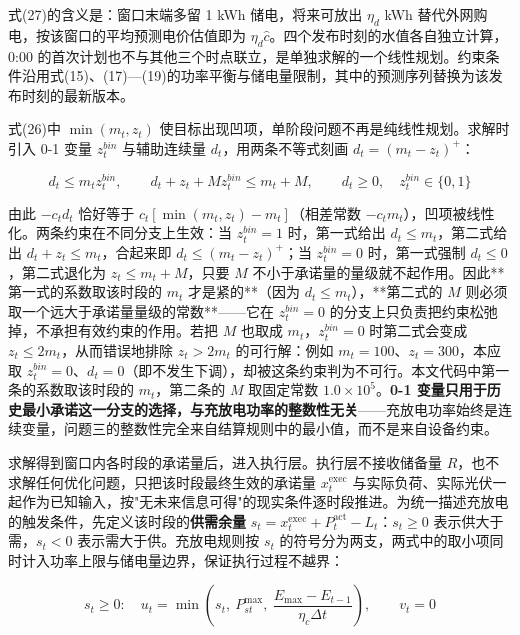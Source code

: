\documentclass[12pt,a4paper]{ctexart}
\begin{document}
式(27)的含义是：窗口末端多留 1 kWh 储电，将来可放出 $\eta_d$ kWh 替代外网购电，按该窗口的平均预测电价估值即为 $\eta_d\hat{c}$。四个发布时刻的水值各自独立计算，0:00 的首次计划也不与其他三个时点联立，是单独求解的一个线性规划。约束条件沿用式(15)、(17)—(19)的功率平衡与储电量限制，其中的预测序列替换为该发布时刻的最新版本。

式(26)中 $\min(m_t,z_t)$ 使目标出现凹项，单阶段问题不再是纯线性规划。求解时引入 0-1 变量 $z^{bin}_t$ 与辅助连续量 $d_t$，用两条不等式刻画 $d_t=\left(m_t-z_t\right)^{+}$：

\begin{equation}
d_t\le m_t z^{bin}_t,\qquad d_t+z_t+M z^{bin}_t\le m_t+M,\qquad d_t\ge0,\quad z^{bin}_t\in\{0,1\}
\end{equation}

由此 $-c_t d_t$ 恰好等于 $c_t[\min(m_t,z_t)-m_t]$（相差常数 $-c_t m_t$），凹项被线性化。两条约束在不同分支上生效：当 $z^{bin}_t=1$ 时，第一式给出 $d_t\le m_t$，第二式给出 $d_t+z_t\le m_t$，合起来即 $d_t\le(m_t-z_t)^{+}$；当 $z^{bin}_t=0$ 时，第一式强制 $d_t\le0$，第二式退化为 $z_t\le m_t+M$，只要 $M$ 不小于承诺量的量级就不起作用。因此**第一式的系数取该时段的 $m_t$ 才是紧的**（因为 $d_t\le m_t$），**第二式的 $M$ 则必须取一个远大于承诺量量级的常数**——它在 $z^{bin}_t=0$ 的分支上只负责把约束松弛掉，不承担有效约束的作用。若把 $M$ 也取成 $m_t$，$z^{bin}_t=0$ 时第二式会变成 $z_t\le 2m_t$，从而错误地排除 $z_t>2m_t$ 的可行解：例如 $m_t=100$、$z_t=300$，本应取 $z^{bin}_t=0$、$d_t=0$（即不发生下调），却被这条约束判为不可行。本文代码中第一条的系数取该时段的 $m_t$，第二条的 $M$ 取固定常数 $1.0\times10^{5}$。\textbf{0-1 变量只用于历史最小承诺这一分支的选择，与充放电功率的整数性无关}——充放电功率始终是连续变量，问题三的整数性完全来自结算规则中的最小值，而不是来自设备约束。

求解得到窗口内各时段的承诺量后，进入执行层。执行层不接收储备量 $R$，也不求解任何优化问题，只把该时段最终生效的承诺量 $x_t^{\mathrm{exec}}$ 与实际负荷、实际光伏一起作为已知输入，按"无未来信息可得"的现实条件逐时段推进。为统一描述充放电的触发条件，先定义该时段的\textbf{供需余量} $s_t=x_t^{\mathrm{exec}}+P_t^{\mathrm{act}}-L_t$：$s_t\ge0$ 表示供大于需，$s_t<0$ 表示需大于供。充放电规则按 $s_t$ 的符号分为两支，两式中的取小项同时计入功率上限与储电量边界，保证执行过程不越界：

\begin{equation}
s_t\ge0:\quad u_t=\min\left(s_t,\ P_{st}^{\max},\ \frac{E_{\max}-E_{t-1}}{\eta_c\Delta t}\right),\qquad v_t=0
\end{equation}
\end{document}
